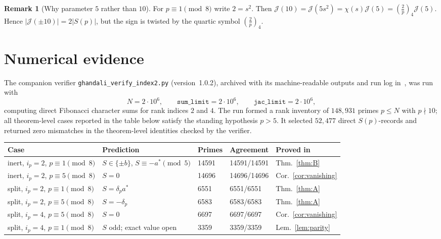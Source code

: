\documentclass[11pt]{amsart}
\theoremstyle{plain}
\theoremstyle{definition}
\newtheorem{remark}[theorem]{Remark}
\newcommand{\qleg}[2]{\left(\frac{#1}{#2}\right)_{\!4}}
\newcommand{\Jac}{\mathcal{J}}
\begin{document}
\begin{remark}[Why parameter $5$ rather than $10$]
For $p\equiv1\pmod8$ write $2=s^2$. Then
$\Jac(10)=\Jac(5s^2)=\chi(s)\Jac(5)=\qleg2p\Jac(5)$.
Hence $|\Jac(\pm10)|=2|S(p)|$, but the sign is twisted by the quartic symbol
$\qleg2p$.
\end{remark}
\section{Numerical evidence}\label{sec:numerics}

The companion verifier \texttt{ghandali\_verify\_index2.py}
(version~1.0.2), archived with its machine-readable outputs and run log
in~\cite{ghandaliIndex2Archive}, was run with
\[
  N=2\cdot 10^{6},
  \qquad
  \texttt{sum\_limit}=2\cdot 10^{6},
  \qquad
  \texttt{jac\_limit}=2\cdot 10^{6},
\]
computing direct Fibonacci character sums for rank indices \(2\) and
\(4\).  The run formed a rank inventory of \(148{,}931\) primes
\(p\le N\) with \(p\nmid10\); all theorem-level cases reported in the
table below satisfy the standing hypothesis \(p>5\).  It selected
\(52{,}477\) direct \(S(p)\)-records and returned zero mismatches in
the theorem-level identities checked by the verifier.

\begin{center}
\small
\begin{tabular}{@{}llp{1.6cm}p{1.8cm}l@{}}
\toprule
Case & Prediction & Primes & Agreement & Proved in\\
\midrule
inert, \(i_p=2\), \(p\equiv1\pmod8\)
  & \(S\in\{\pm b\}\), \(S\equiv-a^{*}\pmod5\)
  & 14591 & 14591/14591 & Thm.~\ref{thm:B}\\
inert, \(i_p=2\), \(p\equiv5\pmod8\)
  & \(S=0\)
  & 14696 & 14696/14696 & Cor.~\ref{cor:vanishing}\\
split, \(i_p=2\), \(p\equiv1\pmod8\)
  & \(S=\delta_p a^{*}\)
  & 6551 & 6551/6551 & Thm.~\ref{thm:A}\\
split, \(i_p=2\), \(p\equiv5\pmod8\)
  & \(S=-\delta_p\)
  & 6583 & 6583/6583 & Thm.~\ref{thm:A}\\
split, \(i_p=4\), \(p\equiv5\pmod8\)
  & \(S=0\)
  & 6697 & 6697/6697 & Cor.~\ref{cor:vanishing}\\
split, \(i_p=4\), \(p\equiv1\pmod8\)
  & \(S\) odd; exact value open
  & 3359 & 3359/3359 & Lem.~\ref{lem:parity}\\
\bottomrule
\end{tabular}
\end{center}
\end{document}
